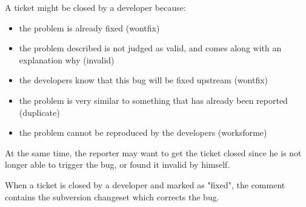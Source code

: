 A ticket might be closed by a developer because:

\begin{itemize}
\item the problem is already fixed (wontfix)
\item the problem described is not judged as valid, and comes along with an explanation why (invalid)
\item the developers know that this bug will be fixed upstream (wontfix)
\item the problem is very similar to something that has already been reported (duplicate)
\item the problem cannot be reproduced by the developers (worksforme)
\end{itemize}

At the same time, the reporter may want to get the ticket closed since he is not 
longer able to trigger the bug, or found it invalid by himself.

When a ticket is closed by a developer and marked as "fixed", the comment contains 
the subversion changeset which corrects the bug.
